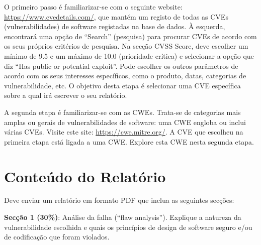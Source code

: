 \documentclass{article}
\begin{document}
O primeiro passo é familiarizar-se com o seguinte website:
\href{https://www.cvedetails.com/} {https://\-www.\-cve\-de\-tails.\-com/}, que mantém um
registo de todas as CVEs (vulnerabilidades) de software registadas na base de
dados. À esquerda, encontrará uma opção de ``Search'' (pesquisa) para procurar CVEs
de acordo com os seus próprios critérios de pesquisa. Na secção CVSS Score, deve
escolher um mínimo de 9.5 e um máximo de 10.0 (prioridade crítica) e selecionar a
opção que diz ``Has public or potential exploit''. Pode escolher os outros
parâmetros de acordo com os seus interesses específicos, como o produto, datas,
categorias de vulnerabilidade, etc. O objetivo desta etapa é selecionar uma CVE
específica sobre a qual irá escrever o seu relatório.

A segunda etapa é familiarizar-se com as CWEs. Trata-se de categorias mais amplas
ou gerais de vulnerabilidades de software: uma CWE engloba ou inclui várias
CVEs. Visite este site: \href{https://cwe.mitre.org/} {https://cwe.mitre.org/}. A
CVE que escolheu na primeira etapa está ligada a uma CWE. Explore esta CWE nesta
segunda etapa.

\section*{Conteúdo do Relatório}

Deve enviar um relatório em formato PDF que inclua as seguintes secções: 

\medskip

\noindent
\textbf{Secção 1 (30\%)}: Análise da falha (``flaw analysis''). Explique a natureza da
vulnerabilidade escolhida e quais os princípios de design de software seguro e/ou de
codificação que foram violados.

\begin{center}
\setlength{\fboxrule}{1.5pt}
\end{center}
\end{document}
